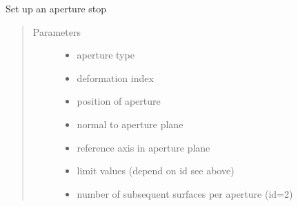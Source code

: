 \documentclass[letterpaper,10pt,english]{sphinxmanual}
\begin{document}
\begin{fulllineitems}
\label{\detokenize{xsrt_functions:xsrt.aperture}}
Set up an aperture stop
\begin{quote}\begin{description}
\item[{Parameters}] \leavevmode\begin{itemize}
\item {} 
 \textendash{} aperture type

\item {} 
 \textendash{} deformation index

\item {} 
 \textendash{} position of aperture

\item {} 
 \textendash{} normal to aperture plane

\item {} 
 \textendash{} reference axis in aperture plane

\item {} 
 \textendash{} limit values (depend on id see above)

\item {} 
 \textendash{} number of subsequent surfaces per aperture (id=2)

\end{itemize}


\end{description}
\end{quote}
\end{fulllineitems}
\end{document}
